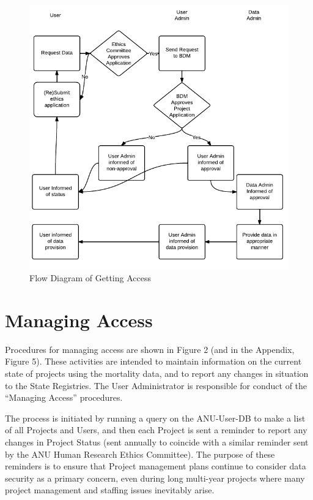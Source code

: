 \documentclass[a4paper]{article}
\begin{document}
\begin{figure}[!h]
\centering
\includegraphics[width=.9\textwidth]{MortalityWFAccess.png}
\caption{Flow Diagram of Getting Access}
\label{fig:DataAccessFlowDiagram-GettingAccess}
\end{figure}
\clearpage
\section{Managing Access}
\label{sec-3}

Procedures for managing access are shown in Figure 2 (and in the Appendix, Figure 5). These activities are intended to maintain information on the current state of projects using the mortality data, and to report any changes in situation to the State Registries. The User Administrator is responsible for conduct of the ``Managing Access'' procedures.

The process is initiated by running a query on the ANU-User-DB to make a list of all Projects and Users, and then each Project is sent a reminder to report any changes in Project Status (sent annually to coincide with a similar reminder sent by the ANU Human Research Ethics Committee). The purpose of these reminders is to ensure that Project management plans continue to consider data security as a primary concern, even during long multi-year projects where many project management and staffing issues inevitably arise.
\end{document}
